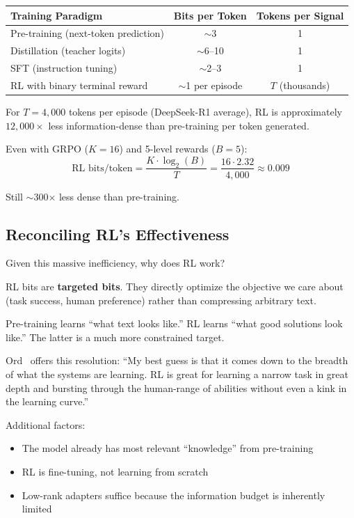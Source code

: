 \documentclass[11pt,a4paper]{article}
\theoremstyle{definition}
\theoremstyle{remark}
\begin{document}
\begin{center}
\begin{tabular}{@{}lcc@{}}
\toprule
\textbf{Training Paradigm} & \textbf{Bits per Token} & \textbf{Tokens per Signal} \\
\midrule
Pre-training (next-token prediction) & $\sim$3 & 1 \\
Distillation (teacher logits) & $\sim$6--10 & 1 \\
SFT (instruction tuning) & $\sim$2--3 & 1 \\
RL with binary terminal reward & $\sim$1 per episode & $T$ (thousands) \\
\bottomrule
\end{tabular}
\end{center}

For $T = 4{,}000$ tokens per episode (DeepSeek-R1 average), RL is approximately $12{,}000\times$ less information-dense than pre-training per token generated.

Even with GRPO ($K = 16$) and 5-level rewards ($B = 5$):
\[
\text{RL bits/token} = \frac{K \cdot \log_2(B)}{T} = \frac{16 \cdot 2.32}{4{,}000} \approx 0.009
\]

Still $\sim$300$\times$ less dense than pre-training.

\subsection{Reconciling RL's Effectiveness}

Given this massive inefficiency, why does RL work?

\begin{keyresult}
RL bits are \textbf{targeted bits}. They directly optimize the objective we care about (task success, human preference) rather than compressing arbitrary text.

Pre-training learns ``what text looks like.'' RL learns ``what good solutions look like.'' The latter is a much more constrained target.
\end{keyresult}

Ord~\cite{ord2025} offers this resolution: ``My best guess is that it comes down to the breadth of what the systems are learning. RL is great for learning a narrow task in great depth and bursting through the human-range of abilities without even a kink in the learning curve.''

Additional factors:
\begin{itemize}
    \item The model already has most relevant ``knowledge'' from pre-training
    \item RL is fine-tuning, not learning from scratch
    \item Low-rank adapters suffice because the information budget is inherently limited
\end{itemize}
\end{document}
